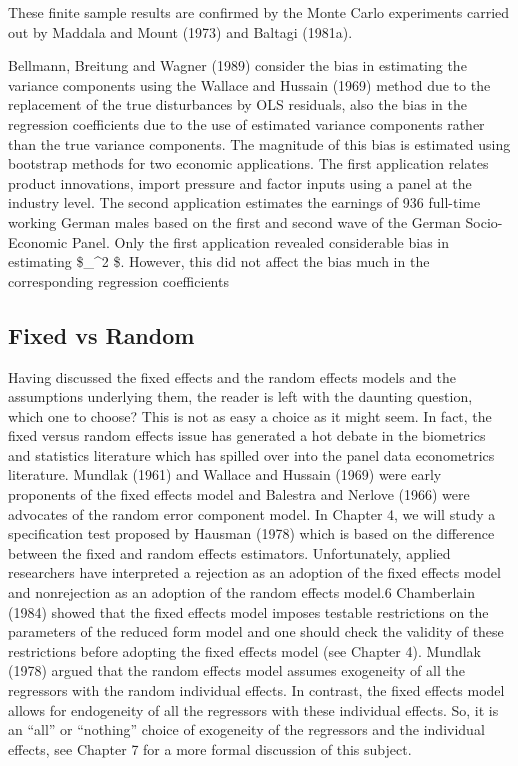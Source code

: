\documentclass[
]{book}
\begin{document}
These finite sample results are confirmed by the Monte Carlo experiments carried out by Maddala and Mount (1973) and Baltagi (1981a).

Bellmann, Breitung and Wagner (1989) consider the bias in estimating the variance components using the Wallace and Hussain (1969) method due to the replacement of the true disturbances by OLS residuals, also the bias in the regression coefficients due to the use of estimated variance components rather than the true variance components. The magnitude of this bias is estimated using bootstrap methods for two economic applications. The first application relates product innovations, import pressure and factor inputs using a panel at the industry level. The second application estimates the earnings of 936 full-time working German males based on the first and second wave of the German Socio-Economic Panel. Only the first application revealed considerable bias in estimating \$\sigma\_\mu\^{}2 \$. However, this did not affect the bias much in the corresponding regression coefficients

\hypertarget{fixed-vs-random}{%
\subsection{Fixed vs Random}\label{fixed-vs-random}}

Having discussed the fixed effects and the random effects models and the assumptions underlying them, the reader is left with the daunting question, which one to choose? This is not as easy a choice as it might seem. In fact, the fixed versus random effects issue has generated a hot debate in the biometrics and statistics literature which has spilled over into the panel data econometrics literature. Mundlak (1961) and Wallace and Hussain (1969) were early proponents of the fixed effects model and Balestra and Nerlove (1966) were advocates of the random error component model. In Chapter 4, we will study a specification test proposed by Hausman (1978) which is based on the difference between the fixed and random effects estimators. Unfortunately, applied researchers have interpreted a rejection as an adoption of the fixed effects model and nonrejection as an adoption of the random effects model.6 Chamberlain (1984) showed that the fixed effects model imposes testable restrictions on the parameters of the reduced form model and one should check the validity of these restrictions before adopting the fixed effects model (see Chapter 4). Mundlak (1978) argued that the random effects model assumes exogeneity of all the regressors with the random individual effects. In contrast, the fixed effects model allows for endogeneity of all the regressors with these individual effects. So, it is an ``all'' or ``nothing'' choice of exogeneity of the regressors and the individual effects, see Chapter 7 for a more formal discussion of this subject.
\end{document}
